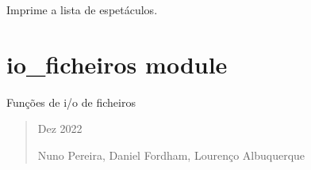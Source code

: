 \documentclass[letterpaper,10pt,portuges]{sphinxmanual}
\begin{document}

\begin{fulllineitems}
\label{\detokenize{espetaculos:espetaculos.imprime_lista_espetaculos}}
\pysigstartsignatures
{}
\pysigstopsignatures
\sphinxAtStartPar
Imprime a lista de espetáculos.
\begin{quote}\begin{description}
\sphinxAtStartPar
{} \textendash{} 

\sphinxAtStartPar


\end{description}\end{quote}

\end{fulllineitems}


\sphinxstepscope


\section{io\_ficheiros module}
\label{\detokenize{io_ficheiros:module-io_ficheiros}}\label{\detokenize{io_ficheiros:io-ficheiros-module}}\label{\detokenize{io_ficheiros::doc}}
\sphinxAtStartPar
Funções de i/o de ficheiros
\begin{quote}\begin{description}
 Dez 2022


\sphinxAtStartPar
Nuno Pereira, Daniel Fordham, Lourenço Albuquerque

\end{description}\end{quote}
\end{document}
